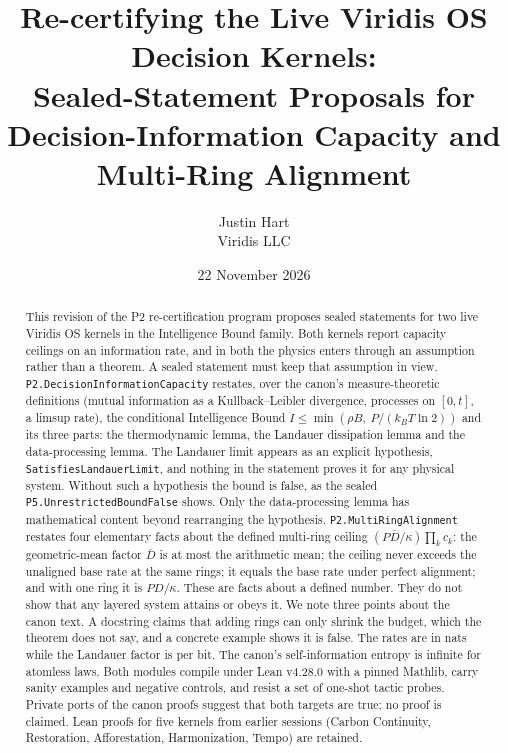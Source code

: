 \documentclass[11pt]{article}
\title{Re-certifying the Live Viridis OS Decision Kernels:\\ Sealed-Statement Proposals for Decision-Information Capacity and Multi-Ring Alignment}
\author{Justin Hart\\ Viridis LLC}
\date{22 November 2026}
\theoremstyle{definition}
\theoremstyle{remark}
\begin{document}
\maketitle

\begin{abstract}
This revision of the P2 re-certification program proposes sealed statements for two live Viridis OS kernels in the
Intelligence Bound family. Both kernels report capacity ceilings on an information rate, and in both the physics enters
through an assumption rather than a theorem. A sealed statement must keep that assumption in view.
\texttt{P2.DecisionInformationCapacity} restates, over the canon's measure-theoretic definitions (mutual information as a
Kullback--Leibler divergence, processes on $[0,t]$, a limsup rate), the conditional Intelligence Bound
$\dot I\le\min(\rho B,\ P/(k_BT\ln 2))$ and its three parts: the thermodynamic lemma, the Landauer dissipation lemma and the
data-processing lemma. The Landauer limit appears as an explicit hypothesis, \texttt{SatisfiesLandauerLimit}, and nothing
in the statement proves it for any physical system. Without such a hypothesis the bound is false, as the sealed
\texttt{P5.UnrestrictedBoundFalse} shows. Only the data-processing lemma has mathematical content beyond rearranging the
hypothesis.
\texttt{P2.MultiRingAlignment} restates four elementary facts about the defined multi-ring ceiling
$(P\bar D/\kappa)\prod_k c_k$: the geometric-mean factor $\bar D$ is at most the arithmetic mean; the ceiling never exceeds the
unaligned base rate at the same rings; it equals the base rate under perfect alignment; and with one ring it is $P D/\kappa$.
These are facts about a defined number. They do not show that any layered system attains or obeys it.
We note three points about the canon text. A docstring claims that adding rings can only shrink the budget, which the
theorem does not say, and a concrete example shows it is false. The rates are in nats while the Landauer factor is per bit.
The canon's self-information entropy is infinite for atomless laws.
Both modules compile under Lean v4.28.0 with a pinned Mathlib, carry sanity examples and negative controls, and resist a set of
one-shot tactic probes. Private ports of the canon proofs suggest that both targets are true; no proof is claimed.
Lean proofs for five kernels from earlier sessions (Carbon Continuity, Restoration, Afforestation, Harmonization, Tempo)
are retained.
\end{abstract}
\end{document}
